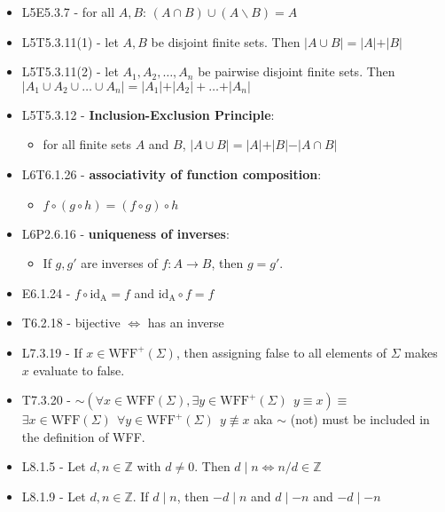\documentclass[10pt, landscape]{article}
\renewcommand{\lnot}{\mathord{\sim}}
\renewcommand{\bf}[1]{\textbf{#1}}
\let\Iff\Leftrightarrow
\begin{document}
\begin{multicols*}{3}
\begin{itemize}
        \item L5E5.3.7 - for all $A, B$: $(A \cap B) \cup (A \backslash B) = A$
        \item L5T5.3.11(1) - let $A, B$ be disjoint finite sets. Then $\vert A \cup B \vert = \vert A \vert + \vert B \vert$
        \item L5T5.3.11(2) - let $A_1, A_2, \dots, A_n$ be pairwise disjoint finite sets. Then $\vert A_1 \cup A_2 \cup \dots \cup A_n \vert = \vert A_1 \vert + \vert A_2 \vert + \dots + \vert A_n \vert$
        \item L5T5.3.12 - \bf{Inclusion-Exclusion Principle}: 
        \begin{itemize}
            \item for all finite sets $A$ and $B$, $\vert A \cup B \vert = \vert A \vert + \vert B \vert - \vert A \cap B \vert$
        \end{itemize} 
        \item L6T6.1.26 - \bf{associativity of function composition}: 
        \begin{itemize}
            \item $f\circ (g \circ h) = (f \circ g) \circ h$
        \end{itemize}
        \item L6P2.6.16 - \bf{uniqueness of inverses}: 
        \begin{itemize}
            \item If $g, g'$ are inverses of $f: A \to B$, then $g = g'$.
        \end{itemize} 
        \item E6.1.24 - $f \circ \text{id}_\text{A} = f$ and $\text{id}_\text{A} \circ f = f$
        \item T6.2.18 - bijective $\Iff$ has an inverse
        \item L7.3.19 - If $x \in \text{WFF}^+(\Sigma)$, then assigning false to all elements of $\Sigma$ makes $x$ evaluate to false.
        \item T7.3.20 - $\lnot( \forall x \in \text{WFF}(\Sigma), \exists y \in \text{WFF}^+(\Sigma) \ \ y \equiv x ) \equiv$
            $\exists x \in \text{WFF}(\Sigma) \ \ \forall y \in \text{WFF}^+(\Sigma) \ \ y \not\equiv x$
            aka $\lnot$ (not) must be included in the definition of WFF.
        \item L8.1.5 - Let $d, n \in \mathbb{Z}$ with $d \neq 0$. Then $d \mid n \Iff n/d \in \mathbb{Z}$ 
        \item L8.1.9 - Let $d, n \in \mathbb{Z}$. If $d \mid n$, then $-d \mid n$ and $d \mid -n$ and $-d \mid -n$ 

\end{itemize}
\end{multicols*}
\end{document}
